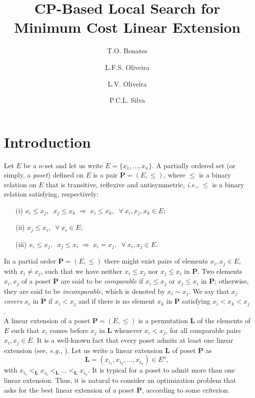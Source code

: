 \documentclass{llncs}
\begin{document}
\title{CP-Based Local Search for Minimum Cost Linear Extension}

\author{T.O. Bonates \and L.F.S. Oliveira \and L.V. Oliveira \and P.C.L. Silva}


\maketitle


\section{Introduction}

Let $E$ be a $n$-set and let us write $E=\{x_1,\ldots,x_n\}$. A partially ordered set (or simply, a \emph{poset}) defined on $E$ is a pair $\mathbf{P}=(E,\leq)$, where $\leq$ is a binary relation on $E$ that is transitive, reflexive and antisymmetric, \emph{i.e.}, $\leq$ is a binary relation satisfying, respectively:

\begin{enumerate}
\item[(i)] $x_i \leq x_j, \;\; x_j \leq x_k \; \Rightarrow \; x_i \leq x_k, \;\; \forall \: x_i, x_j, x_k \in E$;
\item[(ii)] $x_j \leq x_i, \;\; \forall \: x_i \in E$;
\item[(iii)] $x_i \leq x_j, \;\; x_j \leq x_i \; \Rightarrow \; x_i=x_j, \;\; \forall \: x_i,x_j \in E$.\\
\end{enumerate}

In a partial order $\mathbf{P}=(E,\leq)$ there might exist pairs of elements $x_i,x_j \in E$, with $x_i \neq x_j$, such that we have neither $x_i \leq x_j$ nor $x_j \leq x_i$ in $\mathbf P$. Two elements $x_i,x_j$ of a poset $\mathbf P$ are said to be \emph{comparable} if $x_i \leq x_j$ or $x_j \leq x_i$ in $\mathbf{P}$; otherwise, they are said to be \emph{incomparable}, which is denoted by $x_i \sim x_j$. We say that $x_j$ \emph{covers} $x_i$ in $\mathbf P$ if $x_i < x_j$ and if there is no element $x_k$ in $\mathbf P$ satisfying $x_i < x_k < x_j$.\\

A linear extension of a poset $\mathbf{P}=(E,\leq)$ is a permutation $\mathbf{L}$ of the elements of $E$ such that $x_i$ comes before $x_j$ in $\mathbf{L}$ whenever $x_i < x_j$, for all comparable pairs $x_i,x_j \in E$. It is a well-known fact that every poset admits at least one linear extension (see, {\it e.g.}, \cite{Stanley}). Let us write a linear extension $\mathbf{L}$ of poset $\mathbf{P}$ as
\[
{\mathbf L}=\left( x_{i_1}, x_{i_2} , \ldots, x_{i_n} \right) \in E^n,
\]
\noindent with $x_{i_1} <_{\mathbf L} x_{i_2} <_{\mathbf L} \ldots <_{\mathbf L} x_{i_n}$. It is typical for a poset to admit more than one linear extension. Thus, it is natural to consider an optimization problem that asks for the best linear extension of a poset $\mathbf P$, according to some criterion.\\
\end{document}
